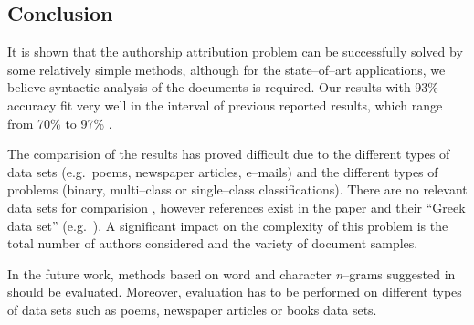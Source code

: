 \documentclass[11pt,english]{article}
\begin{document}
\begin{multicols}{2}
\section{Conclusion}
It is shown that the authorship attribution problem can be successfully solved by
some relatively simple methods, although for the state--of--art applications, we
believe syntactic analysis of the documents is required. Our results with
93\% accuracy fit very well in the interval of previous reported results, which range from
70\% to 97\% \citep{coyotl2006authorship,keselj2003n,luyckx2005shallow,stamatatos2001computer}.

The comparision of the results has proved difficult due to the different types of data sets (e.g.\ poems,
newspaper articles, e--mails) and the different types of problems (binary, multi--class or
single--class classifications). There are no relevant data sets for comparision
\citep{zhao2005effective}, however references exist in the paper
\citep{stamatatos2001computer} and their ``Greek data set'' (e.g.\
\citep{keselj2003n}). A significant impact on the complexity of this problem 
is the total number of authors considered and the variety of document samples.

In the future work, methods based on word and character \emph{n}--grams suggested
in \citep{keselj2003n,peng2003language,coyotl2006authorship} should be
evaluated. Moreover, evaluation has to be performed on different types of data sets
such as poems, newspaper articles or books data sets.




\end{multicols}
\end{document}
